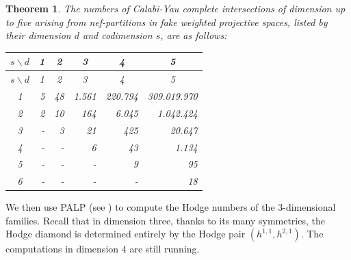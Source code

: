 \documentclass{amsart}
\newtheorem{theorem}[lem]{Theorem}
\theoremstyle{definition}
\begin{document}
\begin{theorem}\label{big theorem}
The numbers of Calabi-Yau complete intersections of dimension up to five arising from nef-partitions in fake weighted projective spaces,
listed by their dimension $d$ and codimension $s$, are as follows:
\newpage
\begin{center}
\renewcommand{\arraystretch}{1.3}
\begin{longtable}{c|rrrrr}
{$s\backslash d$} &
\multicolumn{1}{c}{1} &
\multicolumn{1}{c}{2} &
\multicolumn{1}{c}{3} &
\multicolumn{1}{c}{4} &
\multicolumn{1}{c}{5} \\
\hline
\endfirsthead

{$s\backslash d$} &
\multicolumn{1}{c}{1} &
\multicolumn{1}{c}{2} &
\multicolumn{1}{c}{3} &
\multicolumn{1}{c}{4} &
\multicolumn{1}{c}{5} \\
\hline
\endhead

1 & 5 & 48 & 1.561 & 220.794 & 309.019.970 \\
2 & 2 & 10 & 164 & 6.045 & 1.042.424 \\
3 & - & 3 & 21 & 425 & 20.647 \\
4 & - & - & 6 & 43 & 1.134 \\
5 & - & - & - & 9 & 95 \\
6 & - & - & - & - & 18 \\
\end{longtable}
\end{center}
\end{theorem}
We then use PALP (see \cites{KS,BKSSW}) to compute the Hodge numbers of the $3$-dimensional families. Recall that in dimension three, thanks to its many symmetries, the Hodge diamond is determined entirely by
the Hodge pair $(h^{1,1},h^{2,1})$. The computations in dimension $4$ are still running.
\end{document}
